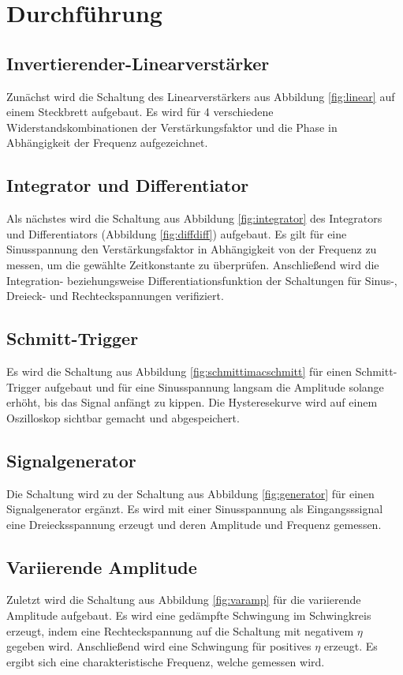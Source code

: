 \section{Durchführung}
\label{sec:Durchführung}


\subsection{Invertierender-Linearverstärker}

Zunächst wird die Schaltung des Linearverstärkers aus Abbildung \ref{fig:linear} auf einem Steckbrett aufgebaut.
Es wird für 4 verschiedene Widerstandskombinationen der Verstärkungsfaktor und die Phase in Abhängigkeit der
Frequenz aufgezeichnet.

\subsection{Integrator und Differentiator}

Als nächstes wird die Schaltung aus Abbildung \ref{fig:integrator} des Integrators und Differentiators (Abbildung \ref{fig:diffdiff}) aufgebaut.
Es gilt für eine Sinusspannung den Verstärkungsfaktor in Abhängigkeit von der Frequenz zu messen, um
die gewählte Zeitkonstante zu überprüfen.
Anschließend wird die Integration- beziehungsweise Differentiationsfunktion der Schaltungen für
Sinus-, Dreieck- und Rechteckspannungen verifiziert.

\subsection{Schmitt-Trigger}

Es wird die Schaltung aus Abbildung \ref{fig:schmittimacschmitt} für einen Schmitt-Trigger aufgebaut und für eine Sinusspannung
langsam die Amplitude solange erhöht, bis das Signal anfängt zu kippen. Die Hysteresekurve wird
auf einem Oszilloskop sichtbar gemacht und abgespeichert. 

\subsection{Signalgenerator}

Die Schaltung wird zu der Schaltung aus Abbildung \ref{fig:generator} für einen Signalgenerator ergänzt.
Es wird mit einer Sinusspannung als Eingangsssignal eine Dreiecksspannung erzeugt und deren
Amplitude und Frequenz gemessen.

\subsection{Variierende Amplitude}

Zuletzt wird die Schaltung aus Abbildung \ref{fig:varamp} für die variierende Amplitude aufgebaut. Es wird eine
gedämpfte Schwingung im Schwingkreis erzeugt, indem eine Rechteckspannung auf die Schaltung
mit negativem $\eta$ gegeben wird. Anschließend wird eine Schwingung für positives $\eta$
erzeugt. Es ergibt sich eine charakteristische Frequenz, welche gemessen wird.